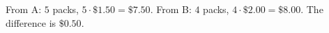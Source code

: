 From A: $5$ packs, $5\cdot\$1.50=\$7.50$. From B: $4$ packs, $4\cdot\$2.00=\$8.00$. The difference is $\boxed{\$0.50}$.
